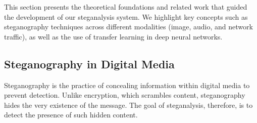 \documentclass[12pt]{article}
\begin{document}
This section presents the theoretical foundations and related work that guided the development of our steganalysis system. We highlight key concepts such as steganography techniques across different modalities (image, audio, and network traffic), as well as the use of transfer learning in deep neural networks.

\subsection{Steganography in Digital Media}

Steganography is the practice of concealing information within digital media to prevent detection. Unlike encryption, which scrambles content, steganography hides the very existence of the message. The goal of steganalysis, therefore, is to detect the presence of such hidden content.
\end{document}
